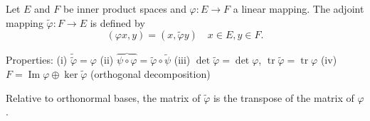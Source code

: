 Let $E$ and $F$ be inner product spaces and $\varphi: E \to F$ a linear mapping. The adjoint mapping $\tilde{\varphi}: F \to E$ is defined by
$$(\varphi x, y) = (x, \tilde{\varphi} y) \quad x \in E, y \in F.$$

Properties:
(i) $\tilde{\tilde{\varphi}} = \varphi$
(ii) $\overbrace{\psi \circ \varphi} = \tilde{\varphi} \circ \tilde{\psi}$
(iii) $\det \tilde{\varphi} = \det \varphi$, $\operatorname{tr} \tilde{\varphi} = \operatorname{tr} \varphi$
(iv) $F = \operatorname{Im} \varphi \oplus \ker \tilde{\varphi}$ (orthogonal decomposition)

Relative to orthonormal bases, the matrix of $\tilde{\varphi}$ is the transpose of the matrix of $\varphi$.
